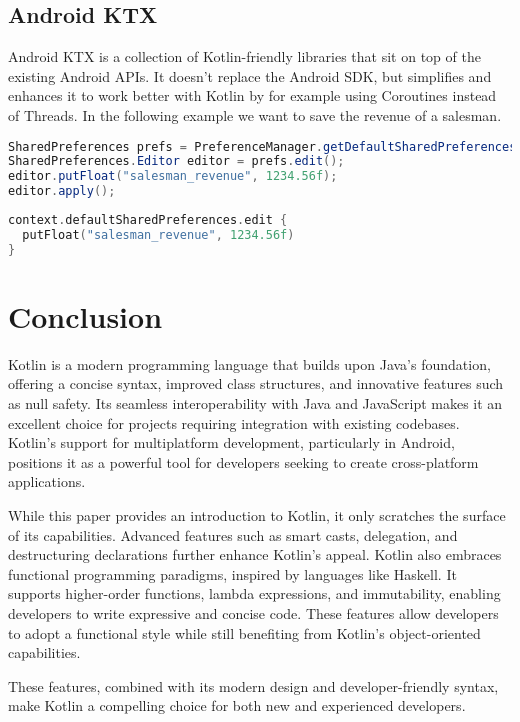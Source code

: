 \documentclass[a4paper,11pt]{article}
\begin{document}
\subsection{Android KTX}
Android KTX is a collection of Kotlin-friendly libraries that sit on top of the existing Android APIs. It doesn’t replace the Android SDK, but simplifies and enhances it to work better with Kotlin by for example using Coroutines instead of Threads.
In the following example we want to save the revenue of a salesman.
\begin{lstlisting}[language=Java, title= {Java save salesman revenue}]
SharedPreferences prefs = PreferenceManager.getDefaultSharedPreferences(context);
SharedPreferences.Editor editor = prefs.edit();
editor.putFloat("salesman_revenue", 1234.56f);
editor.apply();
\end{lstlisting}
\begin{lstlisting}[language=Kotlin, title= {Kotlin save salesman revenue}]
context.defaultSharedPreferences.edit {
  putFloat("salesman_revenue", 1234.56f)
}
\end{lstlisting}

\section{Conclusion}
Kotlin is a modern programming language that builds upon Java's foundation, offering a concise syntax, improved class structures, and innovative features such as null safety. Its seamless interoperability with Java and JavaScript makes it an excellent choice for projects requiring integration with existing codebases. Kotlin's support for multiplatform development, particularly in Android, positions it as a powerful tool for developers seeking to create cross-platform applications.

While this paper provides an introduction to Kotlin, it only scratches the surface of its capabilities. Advanced features such as smart casts, delegation, and destructuring declarations further enhance Kotlin's appeal.
Kotlin also embraces functional programming paradigms, inspired by languages like Haskell. It supports higher-order functions, lambda expressions, and immutability, enabling developers to write expressive and concise code. These features allow developers to adopt a functional style while still benefiting from Kotlin's object-oriented capabilities.

These features, combined with its modern design and developer-friendly syntax, make Kotlin a compelling choice for both new and experienced developers.
\end{document}
